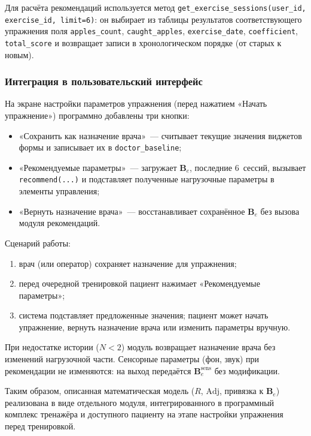 Для расчёта рекомендаций используется метод
\texttt{get\_exercise\_sessions(user\_id, exercise\_id, limit=6)}:
он выбирает из таблицы результатов соответствующего упражнения
поля \texttt{apples\_count}, \texttt{caught\_apples},
\texttt{exercise\_date}, \texttt{coefficient}, \texttt{total\_score}
и возвращает записи в хронологическом порядке (от старых к новым).

\subsubsection{Интеграция в пользовательский интерфейс}

На экране настройки параметров упражнения (перед нажатием
«Начать упражнение») программно добавлены три кнопки:
\begin{itemize}
    \item «Сохранить как назначение врача»~--- считывает текущие
    значения виджетов формы и записывает их в \texttt{doctor\_baseline};
    \item «Рекомендуемые параметры»~--- загружает $\mathbf{B}_e$,
    последние 6~сессий, вызывает \texttt{recommend(...)} и подставляет
    полученные нагрузочные параметры в элементы управления;
    \item «Вернуть назначение врача»~--- восстанавливает сохранённое
    $\mathbf{B}_e$ без вызова модуля рекомендаций.
\end{itemize}

Сценарий работы:
\begin{enumerate}
    \item врач (или оператор) сохраняет назначение для упражнения;
    \item перед очередной тренировкой пациент нажимает
    «Рекомендуемые параметры»;
    \item система подставляет предложенные значения; пациент может
    начать упражнение, вернуть назначение врача или изменить
    параметры вручную.
\end{enumerate}

При недостатке истории ($N < 2$) модуль возвращает назначение врача
без изменений нагрузочной части. Сенсорные параметры (фон, звук)
при рекомендации не изменяются: на выход передаётся
$\mathbf{B}_e^{\mathrm{sens}}$ без модификации.

Таким образом, описанная математическая модель ($R$,
$\mathrm{Adj}$, привязка к $\mathbf{B}_e$) реализована в виде
отдельного модуля, интегрированного в программный комплекс
тренажёра и доступного пациенту на этапе настройки упражнения
перед тренировкой.
